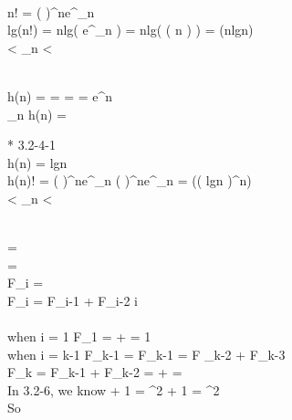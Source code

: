 \\
\because n! = \left (  \right )^{n}e^{\alpha _{n}} \\
\therefore lg(n!) = nlg\left ( \cdot {} \cdot e^{\alpha_{n}}  \right) = nlg\left ( \Theta \left ( n \right ) \right ) = \Theta (nlgn) \\
 < \alpha _{n} < 



\\
h(n) =  =  =  = e^{n} \\
\lim_{n \to \infty }h(n) = \infty

* 3.2-4-1
\\
h(n) = \left \lceil lgn \right \rceil \\
h(n)! = \left (  \right )^{n}e^{\alpha _{n}} \geq {}\left (  \right )^{n}e^{\alpha_{n}} = \Theta (\left ( lgn \right )^{n}) \\
 < \alpha _{n} < 


\\
\phi =  \\
\hat{\phi} =  \\
F_{i} =  \\
F_{i} = F_{i-1} + F_{i-2}  \quad i  \\

\\
when \quad i = 1 \quad F_{1} = \phi + \hat{\phi} = 1 \\
when \quad i = k-1 \quad F_{k-1} =  \quad F_{k-1} = F _{k-2} + F_{k-3} \\ 

F_{k} = F_{k-1} + F_{k-2} =  +  =  \\

In 3.2-6, we know \quad \phi + 1 = \phi ^{2} \quad \hat{\phi} + 1 = \hat{\phi}^{2} \\

So 
